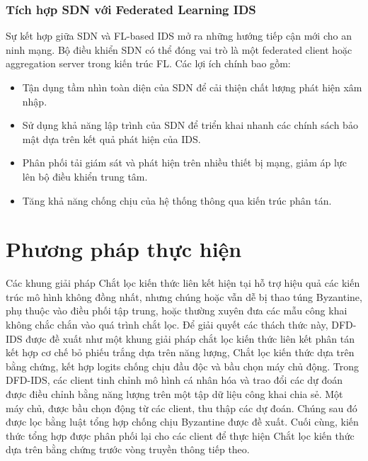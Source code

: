 \subsection{Tích hợp SDN với Federated Learning IDS}
Sự kết hợp giữa SDN và FL-based IDS mở ra những hướng tiếp cận mới cho an ninh mạng. Bộ điều khiển SDN có thể đóng vai trò là một federated client hoặc aggregation server trong kiến trúc FL. Các lợi ích chính bao gồm:
\begin{itemize}
    \item Tận dụng tầm nhìn toàn diện của SDN để cải thiện chất lượng phát hiện xâm nhập.
    \item Sử dụng khả năng lập trình của SDN để triển khai nhanh các chính sách bảo mật dựa trên kết quả phát hiện của IDS.
    \item Phân phối tải giám sát và phát hiện trên nhiều thiết bị mạng, giảm áp lực lên bộ điều khiển trung tâm.
    \item Tăng khả năng chống chịu của hệ thống thông qua kiến trúc phân tán.
\end{itemize}

\pagebreak

\chapter{Phương pháp thực hiện}

Các khung giải pháp Chắt lọc kiến thức liên kết hiện tại hỗ trợ hiệu quả các kiến trúc mô hình không đồng nhất, nhưng chúng hoặc vẫn dễ bị thao túng Byzantine, phụ thuộc vào điều phối tập trung, hoặc thường xuyên đưa các mẫu công khai không chắc chắn vào quá trình chắt lọc. Để giải quyết các thách thức này, DFD-IDS được đề xuất như một khung giải pháp chắt lọc kiến thức liên kết phân tán kết hợp cơ chế bỏ phiếu trắng dựa trên năng lượng, Chắt lọc kiến thức dựa trên bằng chứng, kết hợp logits chống chịu đầu độc và bầu chọn máy chủ động. Trong DFD-IDS, các client tinh chỉnh mô hình cá nhân hóa và trao đổi các dự đoán được điều chỉnh bằng năng lượng trên một tập dữ liệu công khai chia sẻ. Một máy chủ, được bầu chọn động từ các client, thu thập các dự đoán. Chúng sau đó được lọc bằng luật tổng hợp chống chịu Byzantine được đề xuất. Cuối cùng, kiến thức tổng hợp được phân phối lại cho các client để thực hiện Chắt lọc kiến thức dựa trên bằng chứng trước vòng truyền thông tiếp theo.

